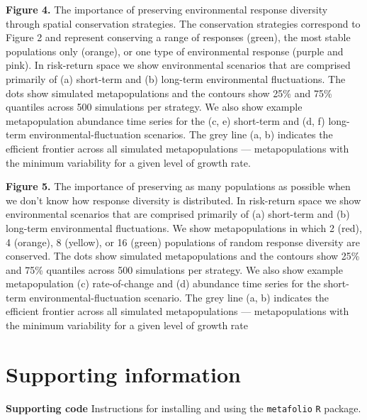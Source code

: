 \documentclass[11pt]{article}
\begin{document}
\begin{spacing}{1.6}

\textbf{Figure 4.} The importance of preserving environmental response diversity through spatial conservation strategies. The conservation strategies correspond to Figure 2 and represent conserving a range of responses (green), the most stable populations only (orange), or one type of environmental response (purple and pink). In risk-return space we show environmental scenarios that are comprised primarily of (a) short-term and (b) long-term environmental fluctuations. The dots show simulated metapopulations and the contours show 25\% and 75\% quantiles across 500 simulations per strategy. We also show example metapopulation abundance time series for the (c, e) short-term and (d, f) long-term environmental-fluctuation scenarios. The grey line (a, b) indicates the efficient frontier across all simulated metapopulations --- metapopulations with the minimum variability for a given level of growth rate.


\textbf{Figure 5.} The importance of preserving as many populations as possible when we don't know how response diversity is distributed. In risk-return space we show environmental scenarios that are comprised primarily of (a) short-term and (b) long-term environmental fluctuations. We show metapopulations in which 2 (red), 4 (orange), 8 (yellow), or 16 (green) populations of random response diversity are conserved. The dots show simulated metapopulations and the contours show 25\% and 75\% quantiles across 500 simulations per strategy. We also show example metapopulation (c) rate-of-change and (d) abundance time series for the short-term environmental-fluctuation scenario. The grey line (a, b) indicates the efficient frontier across all simulated metapopulations --- metapopulations with the minimum variability for a given level of growth rate

\clearpage

\section{Supporting information}

\textbf{Supporting code} Instructions for installing and using the \texttt{metafolio} \texttt{R} package.


\end{spacing}
\end{document}
